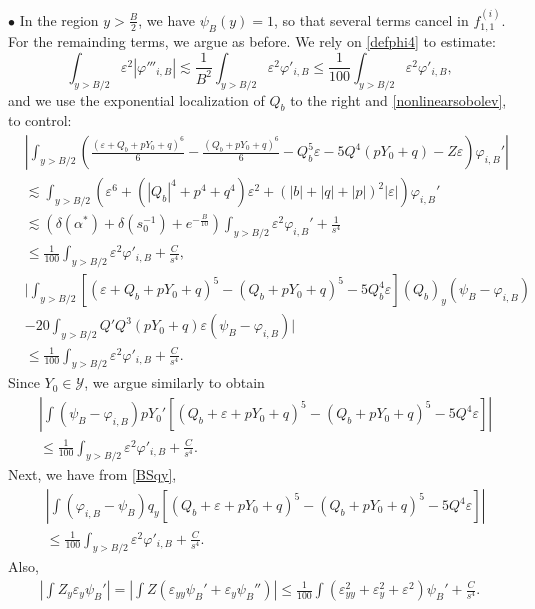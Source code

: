\documentclass[11pt,a4paper,reqno]{amsart}
\theoremstyle{remark}
\numberwithin{equation}{section}
\def\e{\varepsilon}
\def\Yz{Y_0}
\begin{document}
$\bullet$ In the region $y>\frac B2$, we have $\psi_B(y)=1$, so that several terms cancel in $f_{1,1}^{(i)}$. For the remainding terms, we argue as before.
We rely on \eqref{defphi4} to estimate:
$$\int_{y>B/2} \varepsilon^2 |\varphi'''_{i,B}|\lesssim
  \frac 1 {B^2}  \int_{y>B/2} \varepsilon^2 \varphi'_{i,B} \leq  \frac 1{100} \int_{y>B/2} \varepsilon^2 \varphi'_{i,B},$$ and we use the exponential localization of $Q_b$ to the right and \eqref{nonlinearsobolev},   to control:  
  \begin{align*}
& \left| \int_{y>B/2} \left(\frac {(\varepsilon {+} Q_b {+}p\Yz{+}q )^6} 6
-\frac {(Q_b{+}p\Yz{+}q)^6} 6 -Q_b^5 \e - 5 Q^4 (p\Yz{+}q) - Z \e  \right)  \varphi_{i,B}' \right|
\\ 
&   \lesssim 
 \int_{y>B/2} \left(\varepsilon^6  + \left(|Q_b| ^4 +p^4 +q^4 \right)\varepsilon^2
 + (|b|+|q|+|p|)^2 |\e|\right)\varphi_{i,B}' \\
 & \lesssim  (\delta(\alpha^*)+\delta(s_0^{-1})+e^{-\frac B{10}})\int_{y>B/2}  \e^2   \varphi_{i,B}' + \frac 1{s^4}\\
& \leq  \frac 1{100} \int_{y>B/2}  \varepsilon^2   \varphi'_{i,B}
+\frac C{s^4},
\end{align*}
\begin{align*}
& \Bigg| \int_{y>B/2} \left[(\varepsilon+Q_b+p\Yz+q )^5 -(Q_b+p\Yz+q) ^5- 5 Q_b ^4 \varepsilon\right](Q_b )_y (\psi_B-\varphi_{i,B}) \\
&-20 \int_{y>B/2}  Q'Q^3 (p\Yz+q) \e (\psi_B-\varphi_{i,B})\Bigg|\\
&  \leq \frac 1{100} \int_{y>B/2}   \varepsilon^2   \varphi'_{i,B} +\frac C{s^4}.
\end{align*}
Since $\Yz\in \mathcal{Y}$, we   argue similarly to obtain
\begin{align*}
&\left| \int (\psi_B-\varphi_{i,B}) p\Yz' 
\left[ (Q_b+\e+p\Yz+q)^5 - (Q_b+p\Yz+q)^5 - 5Q^4 \e\right]\right| \\
&\leq \frac 1{100} \int_{y>B/2}   \varepsilon^2   \varphi'_{i,B} +\frac C{s^4}.
\end{align*}
Next, we have from \eqref{BSqy},
\begin{align*}
&\left| \int (\varphi_{i,B} - \psi_B) q_y \left[ (Q_b+\e+p\Yz+q)^5 - (Q_b+p\Yz+q)^5 - 5Q^4 \e\right]\right| \\
& 
 \leq \frac 1{100} \int_{y>B/2}   \varepsilon^2   \varphi'_{i,B} +\frac C{s^4}.
\end{align*}
Also,
\begin{align*}
\left| \int Z_y \e_y \psi_B'\right| =
\left| \int Z (\e_{yy} \psi_B' + \e_y \psi_B'')\right|
\leq \frac 1{100} \int (\e_{yy}^2 + \e_y^2 + \e^2) \psi_B' +\frac C{s^4}.
\end{align*}
\end{document}
